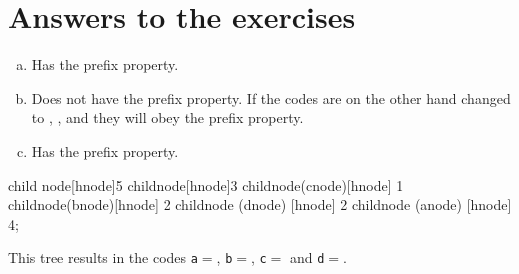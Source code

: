 \section{Answers to the exercises}

\begin{Answer}[ref={prefix-prop}]

  \begin{enumerate}[(a)]
  \item Has the prefix property.
  \item Does not have the prefix property. If the codes are on the
    other hand changed to , ,  and 
    they will obey the prefix property.
  \item Has the prefix property.

  \end{enumerate}

\end{Answer}

\begin{Answer}[ref={nuther}]
  \begin{huffmanc}

    child {node[hnode]{5}
      child{node[hnode]{3}
        child{node(cnode)[hnode] {1}}
        child{node(bnode)[hnode] {2}}}
      child{node (dnode) [hnode] {2}}}
    child{node (anode) [hnode] {4}};


  \end{huffmanc}

  This tree results in the codes \texttt{a}$=$,
  \texttt{b}$=$, \texttt{c}$=$ and
  \texttt{d}$=$.

\end{Answer}